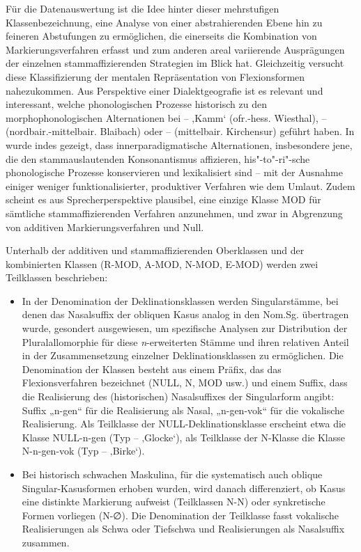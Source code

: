 Für die Datenauswertung ist die Idee hinter dieser mehrstufigen Klassenbezeichnung, eine Analyse von einer abstrahierenden Ebene hin zu feineren Abstufungen zu ermöglichen, die einerseits die Kombination von Markierungsverfahren erfasst und zum anderen areal variierende Ausprägungen der einzelnen stammaffizierenden Strategien im Blick hat. Gleichzeitig versucht diese Klassifizierung der mentalen Repräsentation von Flexionsformen nahezukommen. Aus Perspektive einer Dialektgeografie ist es relevant und interessant, welche phonologischen Prozesse historisch zu den morphophonologischen Alternationen bei  --  ‚Kamm‘ (ofr.-hess. Wiesthal),  --  (nordbair.-mittelbair. Blaibach) oder  --  (mittelbair. Kirchensur) geführt haben. In  wurde indes gezeigt, dass innerparadigmatische Alternationen, insbesondere jene, die den stammauslautenden Konsonantismus affizieren, his"-to"-ri"-sche phonologische Prozesse konservieren und lexikalisiert sind -- mit der Ausnahme einiger weniger funktionalisierter, produktiver Verfahren wie dem Umlaut. Zudem scheint es aus Sprecherperspektive plausibel, eine einzige Klasse MOD für sämtliche stammaffizierenden Verfahren anzunehmen, und zwar in Abgrenzung von additiven Markierungsverfahren und Null.

Unterhalb der additiven und stammaffizierenden Oberklassen und der kombinierten Klassen (R-MOD, A-MOD, N-MOD, E-MOD) werden zwei Teilklassen beschrieben:

\begin{itemize}
\item In der Denomination der Deklinationsklassen werden Singularstämme, bei denen das Nasalsuffix der obliquen Kasus analog in den Nom.Sg. übertragen wurde, gesondert ausgewiesen, um spezifische Analysen zur Distribution der Pluralallomorphie für diese \textit{n}{}-erweiterten Stämme und ihren relativen Anteil in der Zusammensetzung einzelner Deklinationsklassen zu ermöglichen. Die Denomination der Klassen besteht aus einem Präfix, das das Flexionsverfahren bezeichnet (NULL, N, MOD usw.) und einem Suffix, dass die Realisierung des (historischen) Nasalsuffixes der Singularform angibt: Suffix „n-gen“ für die Realisierung als Nasal, „n-gen-vok“ für die vokalische Realisierung. Als Teilklasse der NULL-Deklinationsklasse erscheint etwa die Klasse NULL-n-gen (Typ  --  ‚Glocke‘), als Teilklasse der N-Klasse die Klasse N-n-gen-vok (Typ  --  ‚Birke‘).
\item Bei historisch schwachen Maskulina, für die systematisch auch oblique Singular-Kasusformen erhoben wurden, wird danach differenziert, ob Kasus eine distinkte Markierung aufweist (Teilklassen N-N) oder synkretische Formen vorliegen (N-∅). Die Denomination der Teilklasse fasst vokalische Realisierungen als Schwa oder Tiefschwa und Realisierungen als Nasalsuffix zusammen.
\end{itemize}

